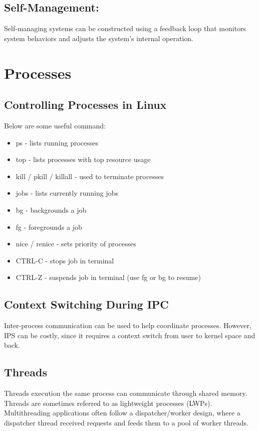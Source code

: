 \documentclass[12pt,titlepage]{article}
\begin{document}
    \subsection{Self-Management:}
      Self-managing systems can be constructed using a feedback loop that monitors system behaviors and adjusts the system's internal operation.

  \section{Processes}
    \subsection{Controlling Processes in Linux}
      Below are some useful command:
      \begin{itemize}
        \item ps - lists running processes
        \item top - lists processes with top resource usage
        \item kill / pkill / killall - used to terminate processes
        \item jobs - lists currently running jobs
        \item bg - backgrounds a job
        \item fg - foregrounds a job
        \item nice / renice - sets priority of processes
        \item CTRL-C - stops job in terminal
        \item CTRL-Z - suspends job in terminal (use fg or bg to resume)
      \end{itemize}

    \subsection{Context Switching During IPC}
      Inter-process communication can be used to help coordinate processes. However, IPS can be costly, since it requires a context switch from user to
      kernel space and back.

    \subsection{Threads}
      Threads execution the same process can communicate through shared memory. Threads are sometimes referred to as lightweight processes (LWPs).
      Multithreading applications often follow a dispatcher/worker design, where a dispatcher thread received requests and feeds them to a pool
      of worker threads.
\end{document}
